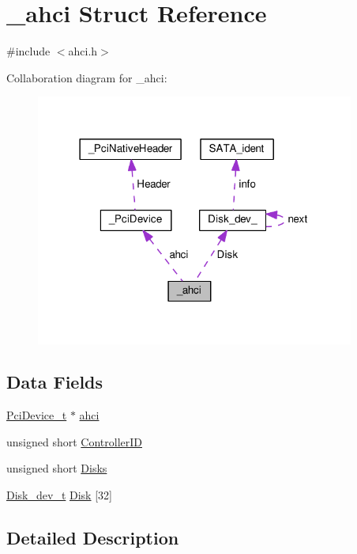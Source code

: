 \hypertarget{struct__ahci}{}\section{\+\_\+ahci Struct Reference}
\label{struct__ahci}


{\ttfamily \#include $<$ahci.\+h$>$}



Collaboration diagram for \+\_\+ahci\+:
\nopagebreak
\begin{figure}[H]
\begin{center}
\leavevmode
\includegraphics[width=297pt]{struct__ahci__coll__graph}
\end{center}
\end{figure}
\subsection*{Data Fields}
\begin{DoxyCompactItemize}
\item 
\hyperlink{PCI_8h_a9b8b354f1d0843a744762fc05dfc7366}{Pci\+Device\+\_\+t} $\ast$ \hyperlink{struct__ahci_ae21f72444b86864fa029b0386bce745c}{ahci}
\item 
unsigned short \hyperlink{struct__ahci_a767cb219a1220db83c0c934c5b9f260f}{Controller\+ID}
\item 
unsigned short \hyperlink{struct__ahci_a8964e69e694ed4ae3a4990889324eaa8}{Disks}
\item 
\hyperlink{ahci_8h_a56fc06d9da2a7877676381fa5d6e3f14}{Disk\+\_\+dev\+\_\+t} \hyperlink{struct__ahci_ae0b46ff5a72b27e8d91fa39d5bd70a74}{Disk} \mbox{[}32\mbox{]}
\end{DoxyCompactItemize}


\subsection{Detailed Description}


